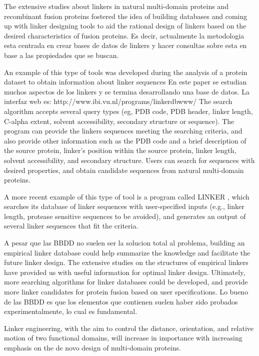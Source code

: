 The extensive studies about linkers in natural multi-domain proteins and recombinant fusion proteins fostered the idea of building databases and coming up with linker designing tools to aid the rational design of linkers based on the desired characteristics of fusion proteins.
Es decir, actualmente la metodologia esta centrada en crear bases de datos de linkers y hacer consultas sobre esta en base a las propiedades que se buscan.


An example of this type of tools was developed during the analysis of a protein dataset to obtain information about linker sequences \cite{george2002analysis}
En este paper se estudian muchos aspectos de los linkers y se termina desarrollando una base de datos. La interfaz web es: http://www.ibi.vu.nl/programs/linkerdbwww/
The search algorithm accepts several query types (eg, PDB code, PDB header, linker length, C-alpha extent, solvent accessibility, secondary structure or sequence). 
The program can provide the linkers sequences meeting the searching criteria, and also provide other
information such as the PDB code and a brief description of the source protein, linker’s
position within the source protein, linker length, solvent accessibility, and secondary
structure. Users can search for sequences with desired properties, and obtain candidate
sequences from natural multi-domain proteins.


A more recent example of this type of tool is a program called LINKER \cite{crasto2000linker,xue2004linker}, which searches its database of linker sequences with user-specified inputs (e.g., linker length, protease sensitive sequences to be avoided), and generates an output of several linker sequences that fit the criteria.


A pesar que las BBDD no suelen ser la solucion total al problema, building an empirical
linker database could help summarize the knowledge and facilitate the future linker design.
The extensive studies on the structures of empirical linkers have provided us with useful
information for optimal linker design. Ultimately, more searching algorithms for linker
databases could be developed, and provide more linker candidates for protein fusion based
on user specifications.
Lo bueno de las BBDD es que los elementos que contienen suelen haber sido probados experimentalmente, lo cual es fundamental.



Linker engineering, with the aim to control the distance, orientation, and relative motion of two functional domains, will increase in importance with increasing emphasis on the de novo design of multi-domain proteins.

